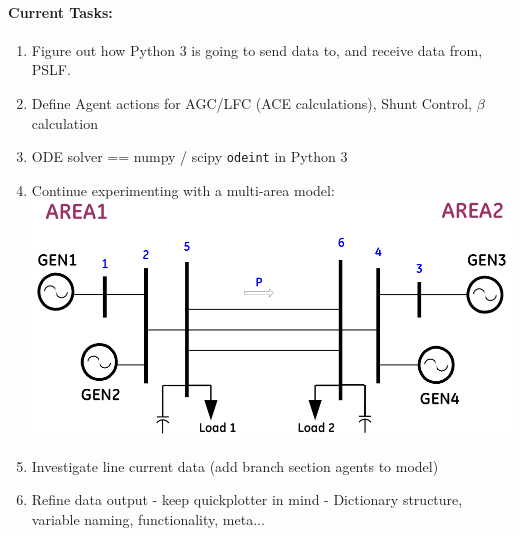 \documentclass[12pt]{article}
\begin{document}
\paragraph{Current Tasks:}
	\begin{enumerate}
		\item Figure out how Python 3 is going to send data to, and receive data from, PSLF.
		\item Define Agent actions for AGC/LFC (ACE calculations), Shunt Control, $\beta$ calculation
		\item ODE solver == numpy / scipy \verb|odeint| in Python 3
		
		\item Continue experimenting with a multi-area model:\\
		\includegraphics[width=.5\linewidth]{g4aSys}
		\item Investigate line current data (add branch section agents to model)
		
		\item Refine data output - keep quickplotter in mind - Dictionary structure, variable naming, functionality, meta...
	\end{enumerate}
\pagebreak
\end{document}
